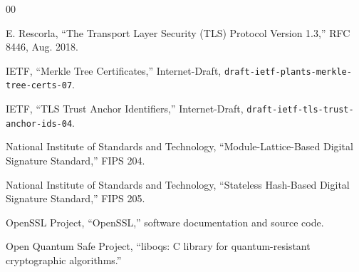 \documentclass[journal]{IEEEtran}
\begin{document}
\begin{thebibliography}{00}




E. Rescorla, ``The Transport Layer Security (TLS) Protocol Version 1.3,'' RFC 8446, Aug. 2018.




IETF, ``Merkle Tree Certificates,'' Internet-Draft, \texttt{draft-ietf-plants-merkle-tree-certs-07}.




IETF, ``TLS Trust Anchor Identifiers,'' Internet-Draft, \texttt{draft-ietf-tls-trust-anchor-ids-04}.




National Institute of Standards and Technology, ``Module-Lattice-Based Digital Signature Standard,'' FIPS 204.




National Institute of Standards and Technology, ``Stateless Hash-Based Digital Signature Standard,'' FIPS 205.




OpenSSL Project, ``OpenSSL,'' software documentation and source code.




Open Quantum Safe Project, ``liboqs: C library for quantum-resistant cryptographic algorithms.''



\end{thebibliography}
\end{document}
